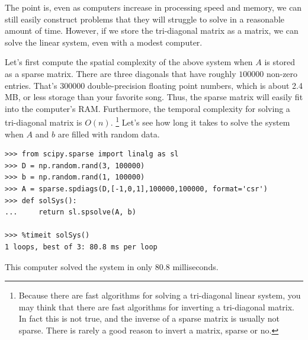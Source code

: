 The point is, even as computers increase in processing speed and memory, we can still easily construct problems that they will struggle to solve in a reasonable amount of time. 
However, if we store the tri-diagonal matrix as a  matrix, we can solve the linear system, even with a modest computer. 

Let's first compute the spatial complexity of the above system when $A$ is stored as a sparse matrix. 
There are three diagonals that have roughly $100000$ non-zero entries. 
That's $300000$ double-precision floating point numbers, which is about 2.4 MB, or less storage than your favorite song. 
Thus, the sparse matrix will easily fit into the computer's RAM. Furthermore, the temporal complexity for solving a tri-diagonal matrix is $O(n)$.
\footnote{Because there are fast algorithms for solving a tri-diagonal linear system, you may think that there are fast algorithms for inverting a tri-diagonal matrix. 
In fact this is not true, and the inverse of a sparse matrix is usually not sparse. 
There is rarely a good reason to invert a matrix, sparse or no.} 
Let's see how long it takes to solve the system when $A$ and $b$ are filled with random data.

\begin{lstlisting}
>>> from scipy.sparse import linalg as sl
>>> D = np.random.rand(3, 100000)
>>> b = np.random.rand(1, 100000)
>>> A = sparse.spdiags(D,[-1,0,1],100000,100000, format='csr')
>>> def solSys():
...     return sl.spsolve(A, b)

>>> %timeit solSys()
1 loops, best of 3: 80.8 ms per loop

\end{lstlisting}

This computer solved the system in only 80.8 milliseconds.

